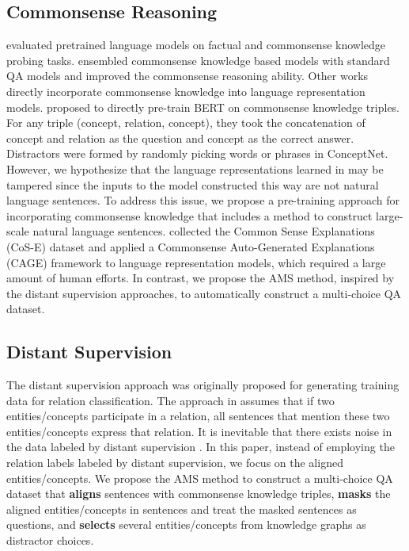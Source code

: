 \documentclass[11pt,a4paper]{article}
\begin{document}
\subsection{Commonsense Reasoning}
\citep{petroni2019language} evaluated pretrained language models on factual and commonsense knowledge probing tasks.
\citep{zhong2018improving} ensembled commonsense knowledge based models with standard QA models and improved the commonsense reasoning ability. 
Other works directly incorporate commonsense knowledge into language representation models. 
\citet{sun2019probing} proposed to directly pre-train BERT on commonsense knowledge triples.
For any triple (concept, relation, concept), they took the concatenation of concept and relation as the question and concept as the correct answer.
Distractors were formed by randomly picking words or phrases in ConceptNet. 
However, we hypothesize that the language representations learned in \citet{sun2019probing} may be tampered since the inputs to the model constructed this way are not natural language sentences. 
To address this issue, we propose a pre-training approach for incorporating commonsense knowledge that includes a method to construct large-scale natural language sentences.
\citet{rajani2019explain} collected the Common Sense Explanations (CoS-E) dataset and applied a Commonsense Auto-Generated Explanations (CAGE) framework to language representation models, which required a large amount of human efforts. 
In contrast, we propose the AMS method, inspired by the distant supervision approaches, to automatically construct a multi-choice QA dataset.

\subsection{Distant Supervision}
The distant supervision approach was originally proposed for generating training data for relation classification.
The approach in \citep{mintz-etal-2009-distant} assumes that if two entities/concepts participate in a relation, all sentences that mention these two entities/concepts express that relation.
It is inevitable that there exists noise in the data labeled by distant supervision \citep{riedel2010modeling}.
In this paper, instead of employing the relation labels labeled by distant supervision, we focus on the aligned entities/concepts. We propose the AMS method to construct a multi-choice QA dataset that \textbf{aligns} sentences with commonsense knowledge triples, \textbf{masks} the aligned entities/concepts in sentences and treat the masked sentences as questions,  and \textbf{selects} several entities/concepts from knowledge graphs as distractor choices.
\end{document}
